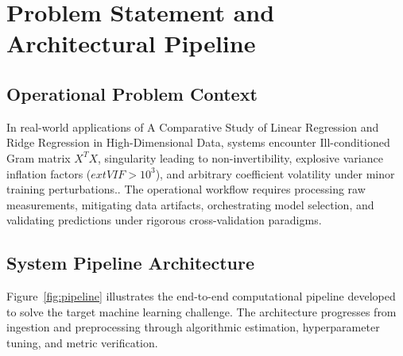 \section{Problem Statement and Architectural Pipeline}

\subsection{Operational Problem Context}
In real-world applications of A Comparative Study of Linear Regression and Ridge Regression in High-Dimensional Data, systems encounter Ill-conditioned Gram matrix $X^T X$, singularity leading to non-invertibility, explosive variance inflation factors ($	ext{VIF} > 10^3$), and arbitrary coefficient volatility under minor training perturbations.. The operational workflow requires processing raw measurements, mitigating data artifacts, orchestrating model selection, and validating predictions under rigorous cross-validation paradigms.

\subsection{System Pipeline Architecture}
Figure~\ref{fig:pipeline} illustrates the end-to-end computational pipeline developed to solve the target machine learning challenge. The architecture progresses from ingestion and preprocessing through algorithmic estimation, hyperparameter tuning, and metric verification.

